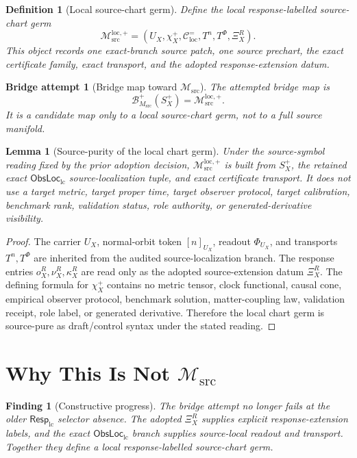 \documentclass[11pt]{article}
\newcommand{\RespLC}{\mathsf{Resp}_{\mathrm{lc}}}
\newcommand{\ObsLocLC}{\mathsf{ObsLoc}_{\mathrm{lc}}}
\newcommand{\Msrc}{\mathcal{M}_{\mathrm{src}}}
\newcommand{\Mloc}{\mathcal{M}_{\mathrm{src}}^{\mathrm{loc},+}}
\newcommand{\XiR}{\Xi_X^R}
\newcommand{\Splus}{S_X^+}
\newcommand{\PhiU}{\Phi_{U_X}}
\newcommand{\Cexact}{\mathcal{C}^{=}_{\mathrm{loc}}}
\newcommand{\BMsrc}{\mathcal{B}^{+}_{M_{\mathrm{src}}}}
\newtheorem{definition}{Definition}
\newtheorem{lemma}{Lemma}
\newtheorem{attempt}{Bridge attempt}
\newtheorem{finding}{Finding}
\begin{document}
\begin{definition}[Local source-chart germ]
Define the local response-labelled source-chart germ
\[
  \Mloc =
  (U_X,\chi_X^+,\Cexact,T^n,T^\Phi,\XiR).
\]
This object records one exact-branch source patch, one source prechart,
the exact certificate family, exact transport, and the adopted
response-extension datum.
\end{definition}

\begin{attempt}[Bridge map toward \(\Msrc\)]
The attempted bridge map is
\[
  \BMsrc(\Splus)=\Mloc.
\]
It is a candidate map only to a local source-chart germ, not to a full
source manifold.
\end{attempt}

\begin{lemma}[Source-purity of the local chart germ]
Under the source-symbol reading fixed by the prior adoption decision,
\(\Mloc\) is built from \(\Splus\), the retained exact
\(\ObsLocLC\) source-localization tuple, and exact certificate
transport. It does not use a target metric, target proper time,
target observer protocol, target calibration, benchmark rank,
validation status, role authority, or generated-derivative visibility.
\end{lemma}

\begin{proof}
The carrier \(U_X\), normal-orbit token \([n]_{U_X}\), readout
\(\PhiU\), and transports \(T^n,T^\Phi\) are inherited from the
audited source-localization branch. The response entries
\(o_X^R,\nu_X^R,\kappa_X^R\) are read only as the adopted
source-extension datum \(\XiR\). The defining formula for
\(\chi_X^+\) contains no metric tensor, clock functional, causal cone,
empirical observer protocol, benchmark solution, matter-coupling law,
validation receipt, role label, or generated derivative. Therefore the
local chart germ is source-pure as draft/control syntax under the
stated reading.
\end{proof}

\section{Why This Is Not \(\Msrc\)}

\begin{finding}[Constructive progress]
The bridge attempt no longer fails at the older \(\RespLC\) selector
absence. The adopted \(\XiR\) supplies explicit response-extension
labels, and the exact \(\ObsLocLC\) branch supplies source-local
readout and transport. Together they define a local
response-labelled source-chart germ.
\end{finding}
\end{document}
